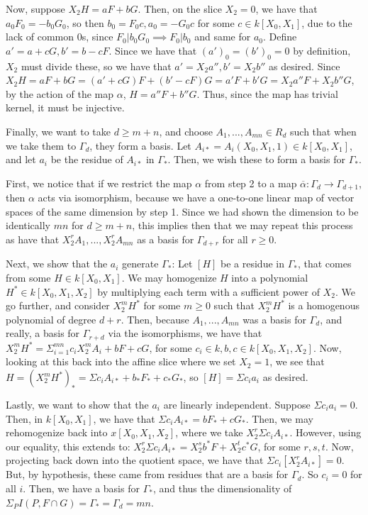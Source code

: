 \documentclass[10pt]{article}
\begin{document}
Now, suppose $X_2 H = aF + bG$. Then, on the slice $X_2 = 0$, we have that $a_0F_0 = - b_0 G_0$, so then $b_0 = F_0c, a_0 = -G_0c$ for some $c \in k[X_0,X_1]$, due to the lack of common 0s, since $F_0 | b_0 G_0 \implies F_0 | b_0$ and same for $a_0$. Define $a' = a  +cG, b' = b - cF$. Since we have that $(a')_0 = (b')_0 = 0$ by definition, $X_2$ must divide these, so we have that $a' = X_2 a'', b' = X_2 b''$ as desired. Since $X_2 H = aF + bG = (a'+cG)F + (b'-cF)G = a'F + b'G = X_2 a''F + X_2 b''G$, by the action of the map $\alpha$, $H = a''F + b''G$. Thus, since the map has trivial kernel, it must be injective.

Finally, we want to take $d \geq m + n$, and choose $A_1,...,A_{mn} \in R_d$ such that when we take them to $\Gamma_d$, they form a basis. Let $A_{i*} = A_i(X_0,X_1,1) \in k[X_0,X_1]$, and let $a_i$ be the residue of $A_{i*}$ in $\Gamma_*$. Then, we wish these to form a basis for $\Gamma_*$.

First, we notice that if we restrict the map $\alpha$ from step 2 to a map $\overline{\alpha}: \Gamma_d \to \Gamma_{d+1}$, then $\alpha$ acts via isomorphism, because we have a one-to-one linear map of vector spaces of the same dimension by step 1. Since we had shown the dimension to be identically $mn$ for $d \geq m +n$, this implies then that we may repeat this process as have that $X_2^r A_1,...,X_2^r A_{mn}$ as a basis for  $\Gamma_{d+r}$ for all $r \geq 0$.

Next, we show that the $a_i$ generate $\Gamma_*$: Let $[H]$ be a residue in $\Gamma_*$, that comes from some $H \in k[X_0,X_1]$. We may homogenize $H$ into a polynomial $H^* \in k[X_0,X_1,X_2]$ by multiplying each term with a sufficient power of $X_2$. We go further, and consider $X_2^m H^*$ for some $m \geq 0$ such that $X_2^m H^*$ is a homogenous polynomial of degree $d + r$. Then, because $A_1,... ,A_{mn}$ was a basis for $\Gamma_d$, and really, a basis for $\Gamma_{r + d}$ via the isomorphisms, we have that $X_2^m H^* = \Sigma_{i=1}^{mn} c_i X_2^m A_i + bF + cG$, for some $c_i \in k, b,c \in k[X_0,X_1,X_2]$. Now, looking at this back into the affine slice where we set $X_2 = 1$, we see that $H = (X_2^m H^*)_* = \Sigma c_i A_{i*} + b_* F_* + c_* G_*$, so $[H] = \Sigma c_i a_i$ as desired. 

Lastly, we want to show that the $a_i$ are linearly independent. Suppose $\Sigma c_i a_i = 0$. Then, in $k[X_0,X_1]$, we have that $\Sigma c_i A_{i*} = b F_* + c G_*$. Then, we may rehomogenize back into $x[X_0,X_1,X_2]$, where we take $X_2^r \Sigma c_i A_{i*}$. However, using our equality, this extends to: $X_2^r \Sigma c_i A_{i*} = X_2^s b^* F + X_2^ t c^* G$, for some $r,s,t$. Now, projecting back down into the quotient space, we have that $\Sigma c_i [ X_2^rA_{i*}] = 0$. But, by hypothesis, these came from residues that are a basis for $\Gamma_d$. So $c_i = 0$ for all $i$. Then, we have a basis for $\Gamma_*$, and thus the dimensionality of $\Sigma_P I(P,F \cap G) = \Gamma_* = \Gamma_d = mn$.
\end{document}
